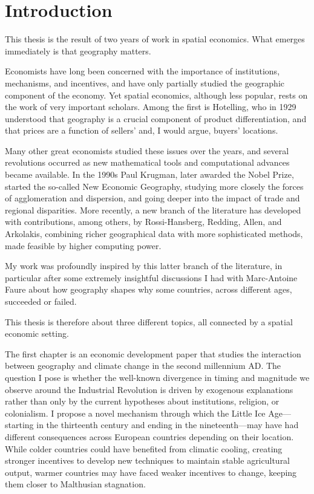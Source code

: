 \documentclass[ twoside,openright,titlepage=firstiscover,numbers=noenddot,headinclude,%
  footinclude=true,cleardoublepage=empty,abstract=true,%
  BCOR=5mm,paper=a4,fontsize=11pt,%
  american,%
]{scrreprt}
\theoremstyle{plain}
\theoremstyle{definition}
\theoremstyle{remark}
\begin{document}
\chapter*{Introduction}

This thesis is the result of two years of work in spatial economics. What emerges immediately is that geography matters.

Economists have long been concerned with the importance of institutions, mechanisms, and incentives, and have only partially studied the geographic component of the economy. Yet spatial economics, although less popular, rests on the work of very important scholars. Among the first is Hotelling, who in 1929 understood that geography is a crucial component of product differentiation, and that prices are a function of sellers' and, I would argue, buyers' locations.

Many other great economists studied these issues over the years, and several revolutions occurred as new mathematical tools and computational advances became available. In the 1990s Paul Krugman, later awarded the Nobel Prize, started the so-called New Economic Geography, studying more closely the forces of agglomeration and dispersion, and going deeper into the impact of trade and regional disparities. More recently, a new branch of the literature has developed with contributions, among others, by Rossi-Hansberg, Redding, Allen, and Arkolakis, combining richer geographical data with more sophisticated methods, made feasible by higher computing power.

My work was profoundly inspired by this latter branch of the literature, in particular after some extremely insightful discussions I had with Marc-Antoine Faure about how geography shapes why some countries, across different ages, succeeded or failed.

This thesis is therefore about three different topics, all connected by a spatial economic setting.

The first chapter is an economic development paper that studies the interaction between geography and climate change in the second millennium AD. The question I pose is whether the well-known divergence in timing and magnitude we observe around the Industrial Revolution is driven by exogenous explanations rather than only by the current hypotheses about institutions, religion, or colonialism. I propose a novel mechanism through which the Little Ice Age---starting in the thirteenth century and ending in the nineteenth---may have had different consequences across European countries depending on their location. While colder countries could have benefited from climatic cooling, creating stronger incentives to develop new techniques to maintain stable agricultural output, warmer countries may have faced weaker incentives to change, keeping them closer to Malthusian stagnation.
\end{document}
